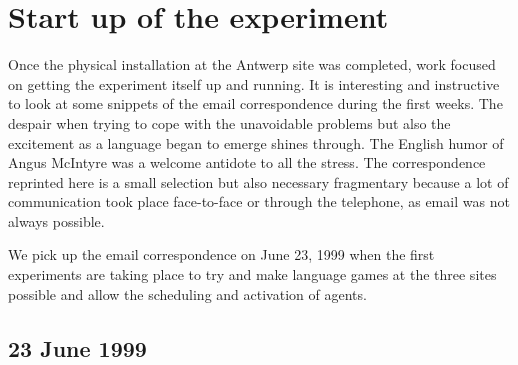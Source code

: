 \section{Start up of the experiment} 

Once the physical installation at the Antwerp site was completed, work focused on getting the experiment itself 
up and running. It is interesting and instructive to look at some snippets of the email correspondence during the 
first weeks. The despair when trying to cope with the unavoidable problems but also the excitement 
as a language began to emerge shines through. The English humor of Angus McIntyre was a welcome antidote to 
all the stress. The correspondence reprinted here is a small selection but also necessary fragmentary because a 
lot of communication took place face-to-face or through the telephone, as email was not always possible. 

We pick up the email correspondence on
June 23, 1999 when the first experiments are taking place to try and make language games at the three sites possible 
and allow the scheduling and activation of agents. 

\subsection*{23 June 1999}


